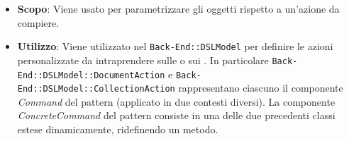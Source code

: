 \begin{itemize}

	\item \textbf{Scopo}: Viene usato per parametrizzare gli oggetti rispetto a un'azione da compiere.
	\item \textbf{Utilizzo}: Viene utilizzato nel  \texttt{Back-End::DSLModel} per definire le azioni personalizzate da intraprendere sulle  o sui . In particolare \texttt{Back-End::DSLModel::DocumentAction} e \texttt{Back-End::DSLModel::CollectionAction} rappresentano ciascuno il componente \textit{Command} del pattern (applicato in due contesti diversi). La componente \textit{ConcreteCommand} del pattern consiste in una delle due precedenti classi estese dinamicamente, ridefinendo un metodo.

\end{itemize}